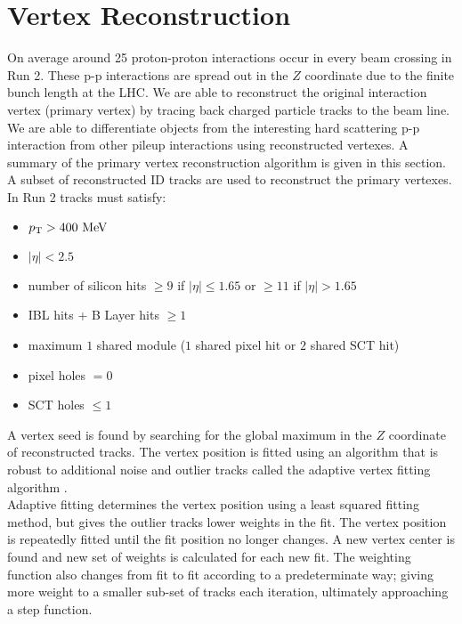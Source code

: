\section{Vertex Reconstruction}
\label{sec:reco:vtx}

\indent On average around 25 proton-proton interactions occur in every beam crossing in Run 2.  These p-p interactions are spread out in the $Z$ coordinate due to the finite bunch length at the LHC.  We are able to reconstruct the original interaction vertex (primary vertex) by tracing back charged particle tracks to the beam line.  We are able to differentiate objects from the interesting hard scattering p-p interaction from other pileup interactions using reconstructed vertexes.  A summary of the primary vertex reconstruction algorithm is given in this section.  \\

\indent A subset of reconstructed ID tracks are used to reconstruct the primary vertexes.  In Run 2 tracks must satisfy:

\begin{itemize}
\item[] $\pt > 400 \mev$
\item[] $|\eta| < 2.5$
\item[] number of silicon hits $ \ge 9$ if $|\eta| \le 1.65$ or $\ge 11$ if $|\eta| > 1.65$
\item[] IBL hits + B Layer hits $\ge 1$
\item[] maximum $1$ shared module ($1$ shared pixel hit or $2$ shared SCT hit)
\item[] pixel holes $= 0$
\item[] SCT holes $\le 1$
\end{itemize}

\indent A vertex seed is found by searching for the global maximum in the $Z$ coordinate of reconstructed tracks.  The vertex position is fitted using an algorithm that is robust to additional noise and outlier tracks called the adaptive vertex fitting algorithm \cite{VertexReco,adaptiveFitting}.  \\

\indent Adaptive fitting determines the vertex position using a least squared fitting method, but gives the outlier tracks lower weights in the fit.  The vertex position is repeatedly fitted until the fit position no longer changes. A new vertex center is found and new set of weights is calculated for each new fit.  The weighting function also changes from fit to fit according to a predeterminate way; giving more weight to a smaller sub-set of tracks each iteration, ultimately approaching a step function.  \\%

